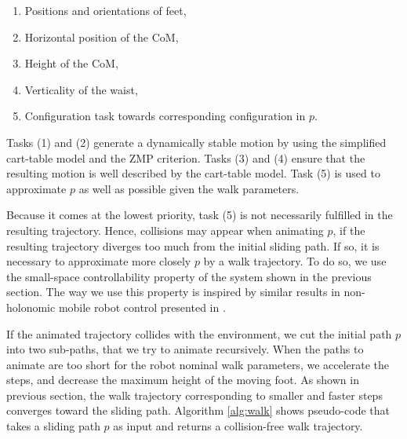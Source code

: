 \documentclass{article}
\begin{document}
\begin{enumerate}

\item Positions and orientations of  feet,

\item Horizontal position of the CoM,

\item Height of the CoM,

\item Verticality of the waist,

\item Configuration task towards corresponding
  configuration  in $p$.

\end{enumerate}

Tasks (1)  and (2) generate a  dynamically stable motion  by using the
simplified cart-table model  and the ZMP criterion. Tasks  (3) and (4)
ensure that the  resulting motion is well described  by the cart-table
model. Task (5)  is used to approximate $p$ as  well as possible given
the walk parameters.

Because it comes at the  lowest priority, task (5) is not necessarily
fulfilled in  the resulting trajectory. Hence,  collisions may appear
when animating $p$, if the resulting trajectory diverges too much from
the initial sliding  path. If so, it is  necessary to approximate more
closely $p$  by a walk  trajectory.  To do  so, we use  the small-space
controllability  property   of  the  system  shown   in  the  previous
section. The way  we use this property is  inspired by similar results
in non-holonomic mobile robot control presented in \cite{taix-94}.

If the animated  trajectory collides with the environment,  we cut the
initial  path   $p$  into  two   sub-paths,  that  we  try   to  animate
recursively. When the  paths to animate are too  short for the robot
nominal  walk parameters, we  accelerate the  steps, and  decrease the
maximum height of  the moving foot. As shown  in previous section, the
walk trajectory  corresponding to  smaller and faster  steps converges
toward the  sliding path.  Algorithm  \ref{alg:walk} shows pseudo-code
that takes  a sliding path $p$  as input and  returns a collision-free
walk trajectory.
\end{document}
